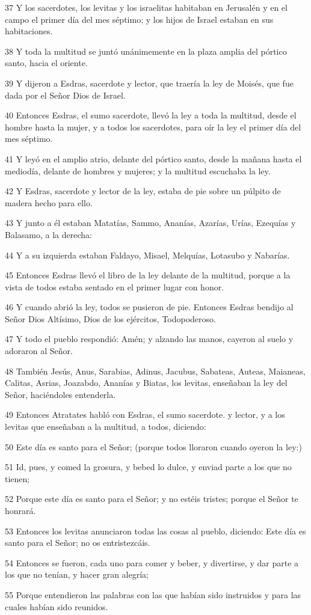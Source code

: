 \par 37 Y los sacerdotes, los levitas y los israelitas habitaban en Jerusalén y en el campo el primer día del mes séptimo; y los hijos de Israel estaban en sus habitaciones.
\par 38 Y toda la multitud se juntó unánimemente en la plaza amplia del pórtico santo, hacia el oriente.
\par 39 Y dijeron a Esdras, sacerdote y lector, que traería la ley de Moisés, que fue dada por el Señor Dios de Israel.
\par 40 Entonces Esdras, el sumo sacerdote, llevó la ley a toda la multitud, desde el hombre hasta la mujer, y a todos los sacerdotes, para oír la ley el primer día del mes séptimo.
\par 41 Y leyó en el amplio atrio, delante del pórtico santo, desde la mañana hasta el mediodía, delante de hombres y mujeres; y la multitud escuchaba la ley.
\par 42 Y Esdras, sacerdote y lector de la ley, estaba de pie sobre un púlpito de madera hecho para ello.
\par 43 Y junto a él estaban Matatías, Sammo, Ananías, Azarías, Urías, Ezequías y Balasamo, a la derecha:
\par 44 Y a su izquierda estaban Faldayo, Misael, Melquías, Lotasubo y Nabarías.
\par 45 Entonces Esdras llevó el libro de la ley delante de la multitud, porque a la vista de todos estaba sentado en el primer lugar con honor.
\par 46 Y cuando abrió la ley, todos se pusieron de pie. Entonces Esdras bendijo al Señor Dios Altísimo, Dios de los ejércitos, Todopoderoso.
\par 47 Y todo el pueblo respondió: Amén; y alzando las manos, cayeron al suelo y adoraron al Señor.
\par 48 También Jesús, Anus, Sarabias, Adinus, Jacubus, Sabateas, Auteas, Maianeas, Calitas, Asrias, Joazabdo, Ananías y Biatas, los levitas, enseñaban la ley del Señor, haciéndoles entenderla.
\par 49 Entonces Atratates habló con Esdras, el sumo sacerdote. y lector, y a los levitas que enseñaban a la multitud, a todos, diciendo:
\par 50 Este día es santo para el Señor; (porque todos lloraron cuando oyeron la ley:)
\par 51 Id, pues, y comed la grosura, y bebed lo dulce, y enviad parte a los que no tienen;
\par 52 Porque este día es santo para el Señor; y no estéis tristes; porque el Señor te honrará.
\par 53 Entonces los levitas anunciaron todas las cosas al pueblo, diciendo: Este día es santo para el Señor; no os entristezcáis.
\par 54 Entonces se fueron, cada uno para comer y beber, y divertirse, y dar parte a los que no tenían, y hacer gran alegría;
\par 55 Porque entendieron las palabras con las que habían sido instruidos y para las cuales habían sido reunidos.

